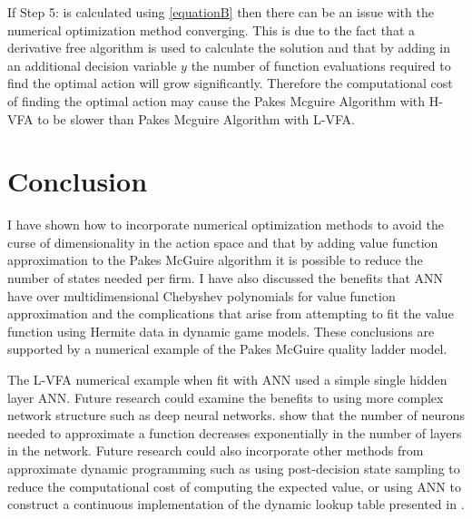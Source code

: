 \documentclass[12pt]{article}
\begin{document}
If Step 5: is calculated using \eqref{equationB} then there can be an issue with the numerical optimization method converging. This is due to the fact that a derivative free algorithm is used to calculate the solution and that by adding in an additional decision variable $y$ the number of function evaluations required to find the optimal action will grow significantly. Therefore the computational cost of finding the optimal action may cause the Pakes Mcguire Algorithm with H-VFA to be slower than Pakes Mcguire Algorithm with L-VFA.



\section{Conclusion}
\label{con}

I have shown how to incorporate numerical optimization methods to avoid the curse of dimensionality in the action space and that by adding value function approximation to the Pakes McGuire algorithm it is possible to reduce the number of states needed per firm. I have also discussed the benefits that ANN have over multidimensional Chebyshev polynomials for value function approximation and the complications that arise from attempting to fit the value function using Hermite data in dynamic game models. These conclusions are supported by a numerical example of the Pakes McGuire quality ladder model.

The L-VFA numerical example when fit with ANN used a simple single hidden layer ANN. Future research could examine the benefits to using more complex network structure such as deep neural networks. \citet{anndeep} show that the number of neurons needed to approximate a function decreases exponentially in the number of layers in the network. Future research could also incorporate other methods from approximate dynamic programming such as using post-decision state sampling to reduce the computational cost of computing the expected value, or using ANN to construct a continuous implementation of the dynamic lookup table presented in \cite{dlt}.

\end{document}
